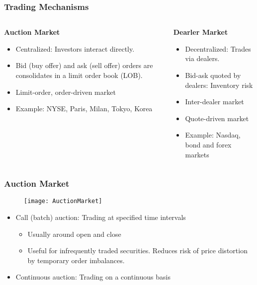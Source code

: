 \documentclass[10pt]{beamer}
\begin{document}
	\begin{frame}
		\frametitle{Trading Mechanisms}
		
		\begin{columns}[onlytextwidth,t]
			\begin{column}{0.48\textwidth}
				\textbf{Auction Market}
				\begin{itemize}
					\item Centralized: Investors interact directly.
					\item Bid (buy offer) and ask (sell offer) orders are consolidates in a limit order book (LOB).
					\item Limit-order, order-driven market
					\item Example: NYSE, Paris, Milan, Tokyo, Korea
				\end{itemize}
			\end{column}
			
			\begin{column}{0.48\textwidth}
				\textbf{Dearler Market}
				\begin{itemize}
					\item Decentralized: Trades via dealers.
					\item Bid-ask quoted by dealers: Inventory risk
					\item Inter-dealer market
					\item Quote-driven market
					\item Example: Nasdaq, bond and forex markets
				\end{itemize}
			\end{column}
			
		\end{columns}
		
	\end{frame}
	\begin{frame}
		\frametitle{Auction Market}
		
		\begin{figure}
			\texttt{[image: AuctionMarket]}
		\end{figure}
		
		\begin{itemize}
			\item Call (batch) auction: Trading at specified time intervals
			\begin{itemize}
				\item Usually around open and close
				\item Useful for infrequently traded securities. Reduces risk of price distortion by temporary order imbalances.
			\end{itemize}
			\item Continuous auction: Trading on a continuous basis
		\end{itemize}	
		
	\end{frame}
\end{document}
